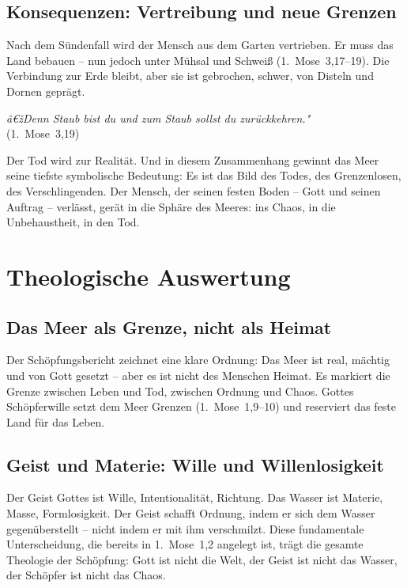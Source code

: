 ﻿\documentclass[a4paper,12pt]{article}
\theoremstyle{definition}
\begin{document}
\subsection{Konsequenzen: Vertreibung und neue Grenzen}

Nach dem Sündenfall wird der Mensch aus dem Garten vertrieben. Er muss das Land
bebauen -- nun jedoch unter Mühsal und Schweiß (1.~Mose~3,17--19). Die Verbindung
zur Erde bleibt, aber sie ist gebrochen, schwer, von Disteln und Dornen geprägt.

\begin{displayquote}
    \textit{â€žDenn Staub bist du und zum Staub sollst du zurückkehren."}\\
    \hfill (1.~Mose~3,19)
\end{displayquote}

Der Tod wird zur Realität. Und in diesem Zusammenhang gewinnt das Meer seine
tiefste symbolische Bedeutung: Es ist das Bild des Todes, des Grenzenlosen,
des Verschlingenden. Der Mensch, der seinen festen Boden -- Gott und seinen Auftrag
-- verlässt, gerät in die Sphäre des Meeres: ins Chaos, in die Unbehaustheit,
in den Tod.

\section{Theologische Auswertung}

\subsection{Das Meer als Grenze, nicht als Heimat}

Der Schöpfungsbericht zeichnet eine klare Ordnung: Das Meer ist real, mächtig
und von Gott gesetzt -- aber es ist nicht des Menschen Heimat. Es markiert die
Grenze zwischen Leben und Tod, zwischen Ordnung und Chaos. Gottes Schöpferwille
setzt dem Meer Grenzen (1.~Mose~1,9--10) und reserviert das feste Land für das
Leben.

\subsection{Geist und Materie: Wille und Willenlosigkeit}

Der Geist Gottes ist Wille, Intentionalität, Richtung. Das Wasser ist Materie,
Masse, Formlosigkeit. Der Geist schafft Ordnung, indem er sich dem Wasser
gegenüberstellt -- nicht indem er mit ihm verschmilzt. Diese fundamentale
Unterscheidung, die bereits in 1.~Mose~1,2 angelegt ist, trägt die gesamte
Theologie der Schöpfung: Gott ist nicht die Welt, der Geist ist nicht das Wasser,
der Schöpfer ist nicht das Chaos.
\end{document}
